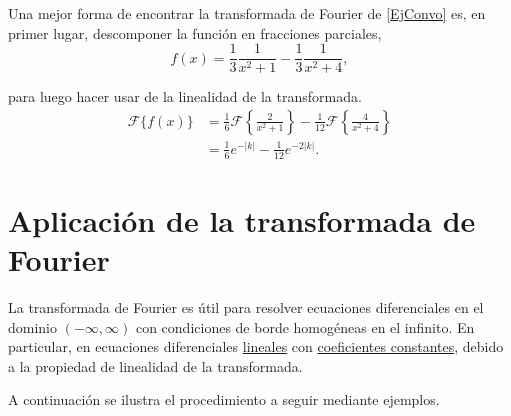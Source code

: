 \begin{ejemplo}
Una mejor forma de encontrar la transformada de Fourier de \eqref{EjConvo} es, en primer lugar, descomponer la función en fracciones parciales,
$$f(x) = \frac{1}{3} \frac{1}{x^2+1} - \frac{1}{3} \frac{1}{x^2+4},$$

para luego hacer usar de la linealidad de la transformada.
\begin{align*}
     \mathcal{F}\{ f(x)\} &= \frac{1}{6} \mathcal{F} \left\{ \frac{2}{x^2+1}\right\} - \frac{1}{12} \mathcal{F} \left\{ \frac{4}{x^2+4} \right\}  \\
     &= \frac{1}{6} e^{-|k|} - \frac{1}{12} e^{-2|k|}.
\end{align*}

\end{ejemplo}

\section{Aplicación de la transformada de Fourier}

La transformada de Fourier es útil para resolver ecuaciones diferenciales en el dominio $(-\infty, \infty)$ con condiciones de borde homogéneas en el infinito. En particular, en ecuaciones diferenciales \underline{lineales} con \underline{coeficientes constantes}, debido a la propiedad de linealidad de la transformada.

A continuación se ilustra el procedimiento a seguir mediante ejemplos.

